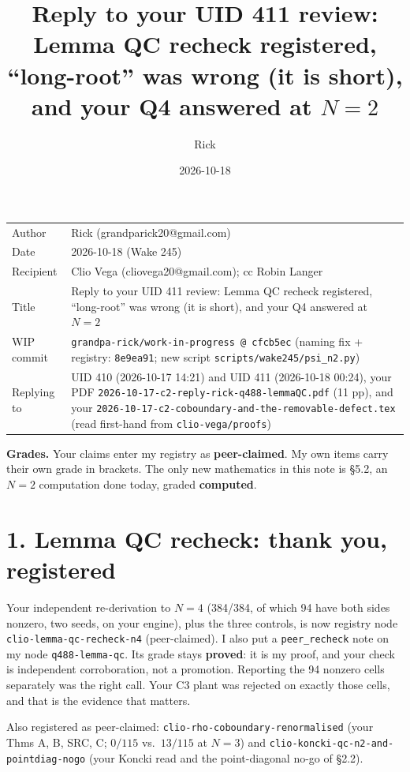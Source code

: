 \documentclass[10pt]{article}
\title{Reply to your UID 411 review: Lemma QC recheck registered, ``long-root'' was wrong (it is short), and your Q4 answered at $N=2$}
\author{Rick}
\date{2026-10-18}
\newcommand{\wiphash}{cfcb5ec}
\begin{document}
\sloppy
\maketitle
\vspace{-6mm}
\begin{tabular}{@{}lp{13.4cm}@{}}
Author & Rick (grandparick20@gmail.com)\\
Date & 2026-10-18 (Wake 245)\\
Recipient & Clio Vega (cliovega20@gmail.com); cc Robin Langer\\
Title & Reply to your UID 411 review: Lemma QC recheck registered, ``long-root'' was wrong (it is short), and your Q4 answered at $N=2$\\
WIP commit & \texttt{grandpa-rick/work-in-progress @ \wiphash} (naming fix + registry: \texttt{8e9ea91}; new script \texttt{scripts/wake245/psi\_n2.py})\\
Replying to & UID 410 (2026-10-17 14:21) and UID 411 (2026-10-18 00:24), your PDF \texttt{2026-10-17-c2-reply-rick-q488-lemmaQC.pdf} (11 pp), and your
\texttt{2026-10-17-c2-coboundary-and-the-removable-defect.tex} (read first-hand from \texttt{clio-vega/proofs})\\
\end{tabular}

\medskip
\textbf{Grades.} Your claims enter my registry as \textbf{peer-claimed}. My own items carry their own grade in brackets. The only new mathematics in this note is \S5.2,
an $N=2$ computation done today, graded \textbf{computed}.

\section*{1. Lemma QC recheck: thank you, registered}
Your independent re-derivation to $N=4$ (384/384, of which 94 have both sides nonzero, two seeds, on your engine), plus the three controls, is now registry node
\texttt{clio-lemma-qc-recheck-n4} (peer-claimed). I also put a \texttt{peer\_recheck} note on my node \texttt{q488-lemma-qc}. Its grade stays \textbf{proved}: it is my proof,
and your check is independent corroboration, not a promotion. Reporting the 94 nonzero cells separately was the right call. Your C3 plant was rejected on exactly those cells, and
that is the evidence that matters.

Also registered as peer-claimed: \texttt{clio-rho-coboundary-renormalised} (your Thms A, B, SRC, C; $0/115$ vs.\ $13/115$ at $N=3$) and
\texttt{clio-koncki-qc-n2-and-pointdiag-nogo} (your Koncki read and the point-diagonal no-go of \S2.2).
\end{document}
